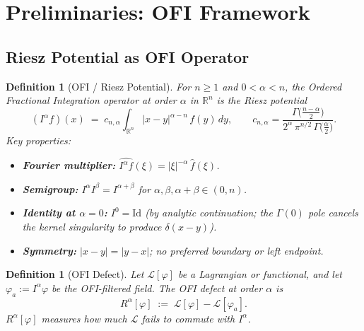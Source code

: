 \documentclass[12pt]{article}
\newtheorem{definition}[theorem]{Definition}
\theoremstyle{definition}
\newcommand{\R}{\mathbb{R}}
\newcommand{\Id}{\mathrm{Id}}
\begin{document}
\section{Preliminaries: OFI Framework}
\label{sec:prelim}

\subsection{Riesz Potential as OFI Operator}

\begin{definition}[OFI / Riesz Potential]
\label{def:riesz}
For $n \geq 1$ and $0 < \alpha < n$, the \emph{Ordered Fractional
Integration} operator at order $\alpha$ in $\R^n$ is the Riesz potential
\begin{equation}
  (I^\alpha f)(x)
  \;=\;
  c_{n,\alpha}
  \int_{\R^n} |x - y|^{\alpha - n}\, f(y)\,dy,
  \qquad
  c_{n,\alpha}
  = \frac{\Gamma\!\bigl(\tfrac{n-\alpha}{2}\bigr)}
         {2^{\alpha}\,\pi^{n/2}\,\Gamma\!\bigl(\tfrac{\alpha}{2}\bigr)}.
\end{equation}
Key properties:
\begin{itemize}[leftmargin=2em]
\item \textbf{Fourier multiplier:}
  $\widehat{I^\alpha f}(\xi) = |\xi|^{-\alpha}\,\hat{f}(\xi)$.
\item \textbf{Semigroup:}
  $I^\alpha I^\beta = I^{\alpha+\beta}$ for
  $\alpha,\beta,\alpha+\beta \in (0,n)$.
\item \textbf{Identity at $\alpha = 0$:}
  $I^0 = \Id$ (by analytic continuation; the $\Gamma(0)$ pole cancels
  the kernel singularity to produce $\delta(x-y)$).
\item \textbf{Symmetry:}
  $|x-y| = |y-x|$; no preferred boundary or left endpoint.
\end{itemize}
\end{definition}

\begin{definition}[OFI Defect]
\label{def:defect}
Let $\mathcal{L}[\varphi]$ be a Lagrangian or functional, and let
$\varphi_a := I^\alpha\varphi$ be the OFI-filtered field.  The
\emph{OFI defect} at order $\alpha$ is
\begin{equation}
  R^\alpha[\varphi]
  \;:=\;
  \mathcal{L}[\varphi] - \mathcal{L}[\varphi_a].
  \label{eq:defect}
\end{equation}
$R^\alpha[\varphi]$ measures how much $\mathcal{L}$ fails to commute with
$I^\alpha$.
\end{definition}
\end{document}
